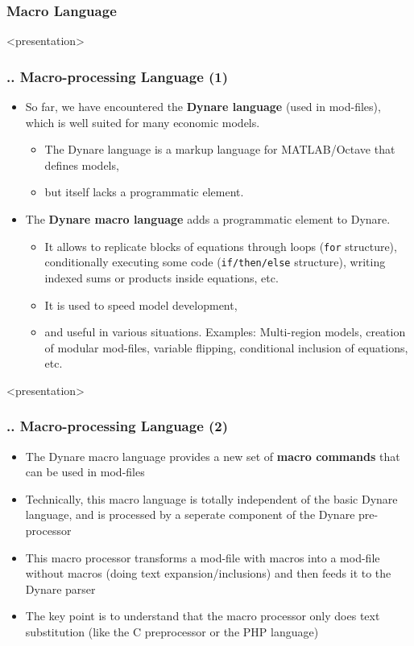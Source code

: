 \documentclass[11pt,aspectratio=169]{beamer}
\begin{document}
\subsubsection{Macro Language}
\begin{frame}<presentation>
	\frametitle{{\thesection.\thesubsection.\thesubsubsection} Macro-processing Language (1)}
	\begin{itemize}
		\item So far, we have encountered the \textbf{Dynare language} (used in mod-files), which is well suited for many economic models. 
		\begin{itemize}
			\item The Dynare language is a markup language for MATLAB/Octave that defines models,
			\item but itself lacks a programmatic element.
		\end{itemize}
		\item The \textbf{Dynare macro language} adds a programmatic element to Dynare.
		\begin{itemize}
			\item It allows to replicate blocks of equations through loops (\texttt{for} structure), conditionally executing some code (\texttt{if/then/else} structure), writing indexed sums or products inside equations, etc.
			\item It is used to speed model development,
			\item and useful in various situations. Examples: Multi-region models, creation of modular mod-files, variable flipping, conditional inclusion of equations, etc.
		\end{itemize}
	\end{itemize}
\end{frame}
\begin{frame}<presentation>
	\frametitle{{\thesection.\thesubsection.\thesubsubsection} Macro-processing Language (2)}
	\begin{itemize}
		\item The Dynare macro language provides a new set of \textbf{macro commands} that can be used in mod-files
		\item Technically, this macro language is totally independent of the basic Dynare language, and is processed by a seperate component of the Dynare pre-processor
		\item This macro processor transforms a mod-file with macros into a mod-file without macros (doing text expansion/inclusions) and then feeds it to the Dynare parser
		\item The key point is to understand that the macro processor only does text substitution (like the C preprocessor or the PHP language)
	\end{itemize}
\end{frame}
\end{document}
